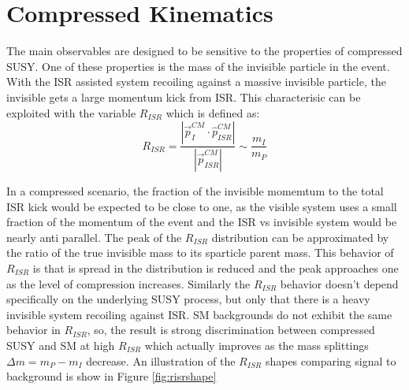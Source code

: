 
\section{Compressed Kinematics}

The main observables are designed to be sensitive to the properties of compressed SUSY. One of these properties is the mass of the invisible particle in the event. With the ISR assisted system recoiling against a massive invisible particle, the invisible gets a large momentum kick from ISR.  This characterisic can be exploited with the variable $R_{ISR}$ which is defined as:
\begin{equation}
R_{ISR} = \frac{|\vec{p}_I^{CM} \cdot \hat{p}_{ISR}^{CM}|}{|\vec{p}_{ISR}^{CM}|} \sim \frac{m_I}{m_P}
\end{equation}

In a compressed scenario, the fraction of the invisible momemtum to the total ISR kick would be expected to be close to one, as the visible system uses a small fraction of the momentum of the event and the ISR vs invisible system would be nearly anti parallel. The peak of the $R_{ISR}$ distribution can be approximated by the ratio of the true invisible mass to its sparticle parent mass.  This behavior of $R_{ISR}$ is that is spread in the distribution is reduced and the peak approaches one as the level of compression increases. Similarly the $R_{ISR}$ behavior doesn't depend specifically on the underlying SUSY process, but only that there is a heavy invisible system recoiling against ISR.  SM backgrounds do not exhibit the same behavior in $R_{ISR}$, so, the result is strong discrimination between compressed SUSY and SM at high $R_{ISR}$ which actually improves as the mass splittings $\Delta m = m_P - m_I$ decrease. An illustration of the $R_{ISR}$ shapes comparing signal to background is show in Figure \ref{fig:risrshape}


